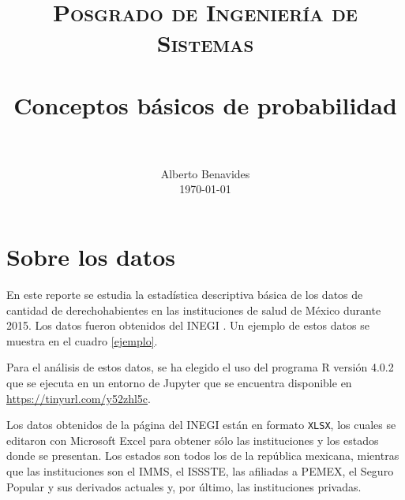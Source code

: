 \documentclass[paper=leter, fontsize=11pt]{scrartcl}
\title{
		\usefont{OT1}{bch}{b}{n}
		\normalfont \normalsize \textsc{Posgrado de Ingeniería de Sistemas} \\ [25pt]
		\horrule{0.5pt} \\[0.4cm]
		\huge Conceptos básicos de probabilidad \\
		\horrule{2pt} \\[0.5cm]
}
\author{
		\normalfont 								\normalsize
        Alberto Benavides\\[-3pt]		\normalsize
        \today
}
\date{}
\numberwithin{equation}{section}		%
\numberwithin{figure}{section}			%
\numberwithin{table}{section}				%
\begin{document}
\maketitle

\section{Sobre los datos}

En este reporte se estudia la estadística descriptiva básica de los datos de cantidad de derechohabientes en las instituciones de salud de México durante 2015. Los datos fueron obtenidos del INEGI \cite{datos}. Un ejemplo de estos datos se muestra en el cuadro \ref{ejemplo}.

\begin{table}[]
    \caption{Ejemplo de datos obtenidos del INEGI que contienen la cantidad de derechohabientes por institución de salud en México durante 2015.}
    \label{ejemplo}
\end{table}

Para el análisis de estos datos, se ha elegido el uso del programa R versión 4.0.2 \cite{r} que se ejecuta en un entorno de Jupyter \cite{jupyter} que se encuentra disponible en \url{https://tinyurl.com/y52zhl5c}.

Los datos obtenidos de la página del INEGI están en formato \texttt{XLSX}, los cuales se editaron con Microsoft Excel \cite{excel} para obtener sólo las instituciones y los estados donde se presentan. Los estados son todos los de la república mexicana, mientras que las instituciones son el IMMS, el ISSSTE, las afiliadas a PEMEX, el Seguro Popular y sus derivados actuales y, por último, las instituciones privadas.
\end{document}
